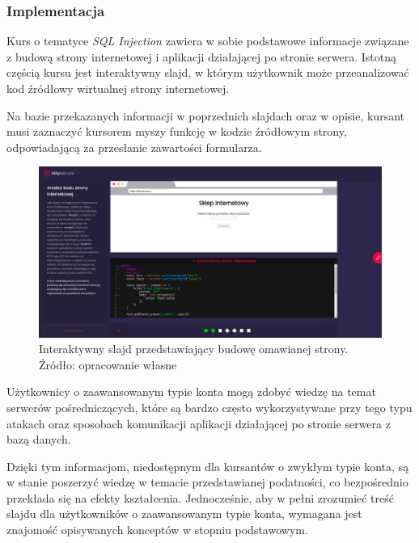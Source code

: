 \documentclass[12pt,twoside]{article}
\begin{document}
\subsubsection{Implementacja}

Kurs o tematyce \emph{SQL Injection} zawiera w sobie podstawowe informacje związane z budową strony internetowej i aplikacji działającej po stronie serwera. Istotną częścią kursu jest interaktywny slajd, w którym użytkownik może przeanalizować kod źródłowy wirtualnej strony internetowej. 

Na bazie przekazanych informacji w poprzednich slajdach oraz w opisie, kursant musi zaznaczyć kursorem myszy funkcję w kodzie źródłowym strony, odpowiadającą za przesłanie zawartości formularza.

\begin{figure}[H]
	\centering
	\includegraphics[width=1\linewidth]{figures/sql-slide-screenshot1.png}
	\caption{Interaktywny slajd przedstawiający budowę omawianej strony. Źródło: opracowanie własne}
	\label{Fig:Interaktywny slajd przedstawiający budowę omawianej strony}
\end{figure} 

Użytkownicy o zaawansowanym typie konta mogą zdobyć wiedzę na temat serwerów pośredniczących, które są bardzo często wykorzystywane przy tego typu atakach oraz sposobach komunikacji aplikacji działającej po stronie serwera z bazą danych. 

Dzięki tym informacjom, niedostępnym dla kursantów o zwykłym typie konta, są w stanie poszerzyć wiedzę w temacie przedstawianej podatności, co bezpośrednio przekłada się na efekty kształcenia. Jednocześnie, aby w pełni zrozumieć treść slajdu dla użytkowników o zaawansowanym typie konta, wymagana jest znajomość opisywanych konceptów w stopniu podstawowym.
\end{document}
